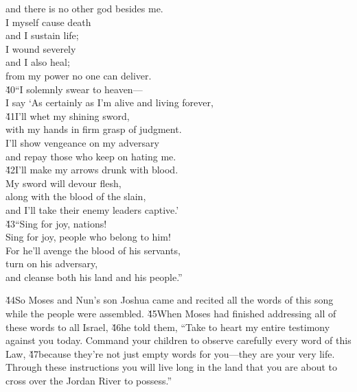 \begin{poetry}
\poemll    and there is no other god besides me. \\
\poeml I myself cause death \\
\poemll    and I sustain life; \\
\poeml I wound severely \\
\poemll    and I also heal; \\
\poemlll       from my power no one can deliver. \\
\poeml \v{40}``I solemnly swear to heaven--- \\
\poemll    I say `As certainly as I'm alive and living forever, \\
\poeml \v{41}I'll whet my shining sword, \\
\poemll    with my hands in firm grasp of judgment. \\
\poeml I'll show vengeance on my adversary \\
\poemll    and repay those who keep on hating me. \\
\poeml \v{42}I'll make my arrows drunk with blood. \\
\poemll    My sword will devour flesh, \\
\poemlll       along with the blood of the slain, \\
\poemll    and I'll take their enemy leaders captive.' \\
\poeml \v{43}``Sing for joy, nations! \\
\poemll    Sing for joy, people who belong to him! \\
\poeml For he'll avenge the blood of his servants, \\
\poemll    turn on his adversary, \\
\poemlll       and cleanse both his land and his people.''
\end{poetry}

\v{44}So Moses and Nun's son Joshua came and recited all the words of this song while the people were assembled. \v{45}When Moses had finished addressing all of these words to all Israel, \v{46}he told them, ``Take to heart my entire testimony against you today. Command your children to observe carefully every word of this Law, \v{47}because they're not just empty words for you---they are your very life. Through these instructions you will live long in the land that you are about to cross over the Jordan River to possess.''

